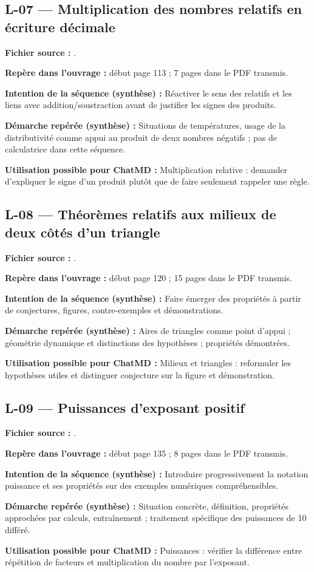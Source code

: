\documentclass[11pt,a4paper]{article}
\begin{document}
\subsection{L-07 — Multiplication des nombres relatifs en écriture décimale}
\textbf{Fichier source :} .\par
\textbf{Repère dans l’ouvrage :} début page 113 ; 7 pages dans le PDF transmis.\par
\textbf{Intention de la séquence (synthèse) :} Réactiver le sens des relatifs et les liens avec addition/soustraction avant de justifier les signes des produits.\par
\textbf{Démarche repérée (synthèse) :} Situations de températures, usage de la distributivité comme appui au produit de deux nombres négatifs ; pas de calculatrice dans cette séquence.\par
\textbf{Utilisation possible pour ChatMD :} Multiplication relative : demander d’expliquer le signe d’un produit plutôt que de faire seulement rappeler une règle.\par
\subsection{L-08 — Théorèmes relatifs aux milieux de deux côtés d’un triangle}
\textbf{Fichier source :} .\par
\textbf{Repère dans l’ouvrage :} début page 120 ; 15 pages dans le PDF transmis.\par
\textbf{Intention de la séquence (synthèse) :} Faire émerger des propriétés à partir de conjectures, figures, contre-exemples et démonstrations.\par
\textbf{Démarche repérée (synthèse) :} Aires de triangles comme point d’appui ; géométrie dynamique et distinctions des hypothèses ; propriétés démontrées.\par
\textbf{Utilisation possible pour ChatMD :} Milieux et triangles : reformuler les hypothèses utiles et distinguer conjecture sur la figure et démonstration.\par
\subsection{L-09 — Puissances d’exposant positif}
\textbf{Fichier source :} .\par
\textbf{Repère dans l’ouvrage :} début page 135 ; 8 pages dans le PDF transmis.\par
\textbf{Intention de la séquence (synthèse) :} Introduire progressivement la notation puissance et ses propriétés sur des exemples numériques compréhensibles.\par
\textbf{Démarche repérée (synthèse) :} Situation concrète, définition, propriétés approchées par calculs, entraînement ; traitement spécifique des puissances de 10 différé.\par
\textbf{Utilisation possible pour ChatMD :} Puissances : vérifier la différence entre répétition de facteurs et multiplication du nombre par l’exposant.\par
\end{document}
